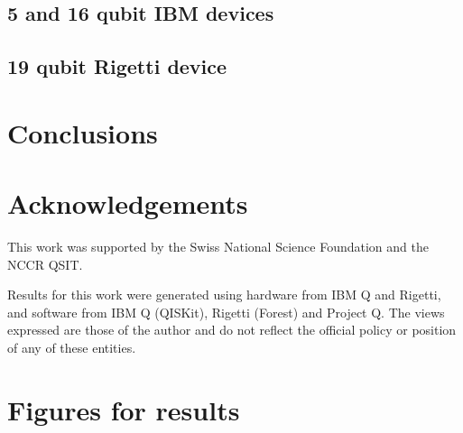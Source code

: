 \documentclass[aps,prl,twocolumn,showpacs,preprintnumbers]{revtex4-1}
\begin{document}
\subsection{5 and 16 qubit IBM devices}

\subsection{19 qubit Rigetti device}




\section{Conclusions}







\section{Acknowledgements}

This work was supported by the Swiss National Science Foundation and the NCCR QSIT.

Results for this work were generated using hardware from IBM Q and Rigetti, and software from IBM Q (QISKit), Rigetti (Forest) and Project Q. The views expressed are those of the author and do not reflect the official policy or position of any of these entities.




\appendix

\section{Figures for results}
\end{document}
